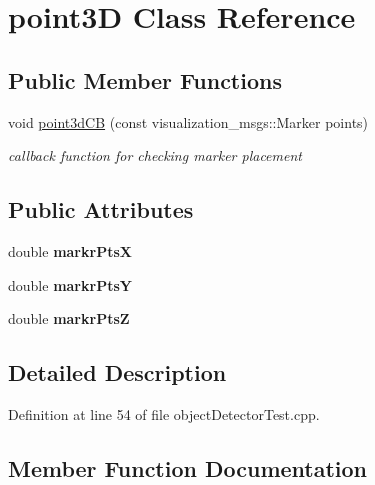 \hypertarget{classpoint3_d}{}\section{point3D Class Reference}
\label{classpoint3_d}
\subsection*{Public Member Functions}
\begin{DoxyCompactItemize}
\item 
void \hyperlink{classpoint3_d_a0131393a383c7f08adbda22f2bd048b1}{point3d\+CB} (const visualization\+\_\+msgs\+::\+Marker points)
\begin{DoxyCompactList}\small\item\em callback function for checking marker placement \end{DoxyCompactList}\end{DoxyCompactItemize}
\subsection*{Public Attributes}
\begin{DoxyCompactItemize}
\item 
double {\bfseries markr\+PtsX}\hypertarget{classpoint3_d_a18eaedb9d52e9c544e4f0701b5060239}{}\label{classpoint3_d_a18eaedb9d52e9c544e4f0701b5060239}

\item 
double {\bfseries markr\+PtsY}\hypertarget{classpoint3_d_a46a138a2ec6169007b3a12fd03936cd1}{}\label{classpoint3_d_a46a138a2ec6169007b3a12fd03936cd1}

\item 
double {\bfseries markr\+PtsZ}\hypertarget{classpoint3_d_a54ee54a7f7fe0e1cf6a888f7f2497557}{}\label{classpoint3_d_a54ee54a7f7fe0e1cf6a888f7f2497557}

\end{DoxyCompactItemize}


\subsection{Detailed Description}


Definition at line 54 of file object\+Detector\+Test.\+cpp.



\subsection{Member Function Documentation}
